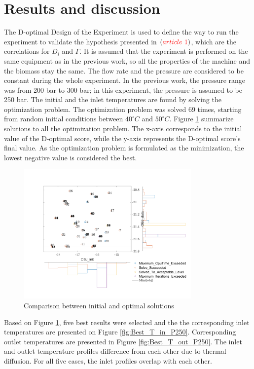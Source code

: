 \documentclass[]{scrartcl}
\begin{document}
\section{Results and discussion}
The D-optimal Design of the Experiment is used to define the way to run the experiment to validate the hypothesis presented in $({\color{red}article~1})$, which are the correlations for $D_i$ and $\Gamma$. It is assumed that the experiment is performed on the same equipment as in the previous work, so all the properties of the machine and the biomass stay the same. The flow rate and the pressure are considered to be constant during the whole experiment. In the previous work, the pressure range was from 200 bar to 300 bar; in this experiment, the pressure is assumed to be 250 bar. The initial and the inlet temperatures are found by solving the optimization problem. The optimization problem was solved 69 times, starting from random initial conditions between $40^\circ C$ and $50^\circ C$. Figure \ref{fig:monet_carlo_P250} summarize solutions to all the optimization problem. The x-axis corresponds to the initial value of the D-optimal score, while the y-axis represents the D-optimal score's final value. As the optimization problem is formulated as the minimization, the lowest negative value is considered the best.

\begin{figure}[!h]
	\centering
	\includegraphics[width=0.80\textwidth, trim = 0cm 0cm 0cm 0cm, clip]{Multiple_shot_DOE_P250.pdf}
	\caption{Comparison between initial and optimal solutions}
	\label{fig:monet_carlo_P250}
\end{figure}

Based on Figure \ref{fig:monet_carlo_P250}, five best results were selected and the the corresponding inlet temperatures are presented on Figure \ref{fig:Best_T_in_P250}. Corresponding outlet temperatures are presented in Figure \ref{fig:Best_T_out_P250}. The inlet and outlet temperature profiles difference from each other due to thermal diffusion. For all five cases, the inlet profiles overlap with each other.
\end{document}
